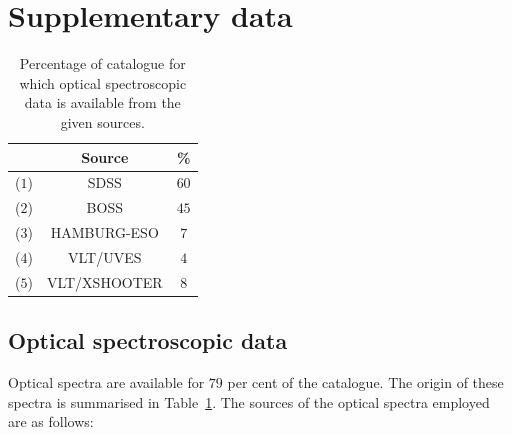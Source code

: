 \section{Supplementary data}

\begin{table}
  \centering
  \footnotesize 
  \caption{Percentage of catalogue for which optical spectroscopic data is available from the given sources.}
  \label{tab:optical-data}
    \begin{tabular}{ccc}
    \hline
    & Source & \% \\
    \hline
    ($1$) & SDSS & $60$ \\
    ($2$) & BOSS & $45$ \\
    ($3$) & HAMBURG-ESO & $7$ \\
    ($4$) & VLT/UVES & $4$ \\
    ($5$) & VLT/XSHOOTER & $8$ \\ 
    \hline
    \end{tabular}
\end{table} 

\subsection{Optical spectroscopic data}

Optical spectra are available for $79$ per cent of the catalogue. 
The origin of these spectra is summarised in Table~\ref{tab:optical-data}. 
The sources of the optical spectra employed are as follows:

